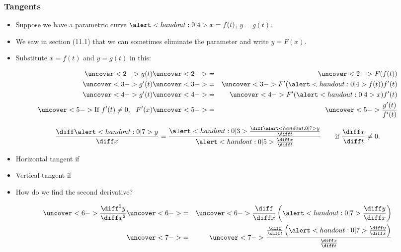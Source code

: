\begin{frame}
\frametitle{Tangents}
\begin{itemize}
\item  Suppose we have a parametric curve $\alert<handout:0| 4>{x = f(t)}$, $y = g(t)$.
\item  We saw in section (11.1) that we can sometimes eliminate the parameter and write $y = F(x)$.
\item<2->  Substitute $x = f(t)$ and $y = g(t)$ in this:
\end{itemize}
\begin{eqnarray*}
\uncover<2->{%
g(t)%
}%
& \uncover<2->{ = } &%
\uncover<2->{%
F(f(t))%
}\\%
\uncover<3->{%
g'(t)%
}%
& \uncover<3->{ = } &%
\uncover<3->{%
F'(\alert<handout:0| 4>{f(t)})f'(t)%
}\\%
\uncover<4->{%
g'(t)%
}%
& \uncover<4->{ = } &%
\uncover<4->{%
F'(\alert<handout:0| 4>{x})f'(t)%
}\\%
\uncover<5->{%
\textrm{If } f'(t)\neq 0, \ \ F'(x)%
}%
& \uncover<5->{ = } &%
\uncover<5->{%
\frac{g'(t)}{f'(t)}%
}%
\end{eqnarray*}
%
\end{frame}


\begin{frame}
\[
\frac{\diff \alert<handout:0| 7>{y}}{\diff x} = \frac{\alert<handout:0| 3>{\frac{\diff \alert<handout:0| 7>{y}}{\diff t}}}{\alert<handout:0| 5>{\frac{\diff x}{\diff t}}}  \qquad \textrm{if} \ \frac{\diff x}{\diff t} \neq 0.%
\]
\begin{itemize}
\item<1-| alert@2-3>  Horizontal tangent if 
\item<1-| alert@4-5>  Vertical tangent if 
\item<6->  How do we find the second derivative?
\end{itemize}
\begin{eqnarray*}
\uncover<6->{%
\frac{\diff^2 y}{\diff x^2}%
}%
& \uncover<6->{ = } &%
\uncover<6->{%
\frac{\diff}{\diff x}\left( \alert<handout:0| 7>{\frac{\diff y}{\diff x}}\right)%
}\\%
& \uncover<7->{ = } &%
\uncover<7->{%
\frac{\frac{\diff}{\diff t}\left( \alert<handout:0| 7>{\frac{\diff y}{\diff x}}\right)}{\frac{\diff x}{\diff t}}%
}%
\end{eqnarray*}
\end{frame}
